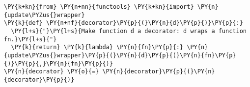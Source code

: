 \begin{Verbatim}[commandchars=\\\{\}]
\PY{k+kn}{from} \PY{n+nn}{functools} \PY{k+kn}{import} \PY{n}{update\PYZus{}wrapper}
\PY{k}{def} \PY{n+nf}{decorator}\PY{p}{(}\PY{n}{d}\PY{p}{)}\PY{p}{:}
  \PY{l+s}{"}\PY{l+s}{Make function d a decorator: d wraps a function fn.}\PY{l+s}{"}
  \PY{k}{return} \PY{k}{lambda} \PY{n}{fn}\PY{p}{:} \PY{n}{update\PYZus{}wrapper}\PY{p}{(}\PY{n}{d}\PY{p}{(}\PY{n}{fn}\PY{p}{)}\PY{p}{,}\PY{n}{fn}\PY{p}{)}
\PY{n}{decorator} \PY{o}{=} \PY{n}{decorator}\PY{p}{(}\PY{n}{decorator}\PY{p}{)} 
\end{Verbatim}
